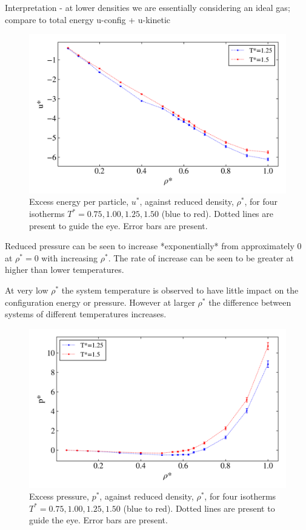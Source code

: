 \documentclass[10pt, twocolumn]{revtex4}    %
\begin{document}
Interpretation - at lower densities we are essentially considering an ideal gas; compare to total energy u-config + u-kinetic

\begin{figure}
	\includegraphics[width=\linewidth]{figures/excessEnergyPressure/excessEnergy.png}
	\caption{Excess energy per particle, $u^*$, against reduced density, $\rho{}^*$, for four isotherms $T^{*} = 0.75, 1.00, 1.25, 1.50$ (blue to red). Dotted lines are present to guide the eye. Error bars are present.}
	\label{fig:excessEnergy}
\end{figure}

Reduced pressure can be seen to increase *exponentially* from approximately $0$ at $\rho{}^*=0$ with increasing $\rho{}^*$. The rate of increase can be seen to be greater at higher than lower temperatures.


At very low $\rho{}^*$ the system temperature is observed to have little impact on the configuration energy or pressure. However at larger $\rho{}^*$ the difference between systems of different temperatures increases.


\begin{figure}
	\includegraphics[width=\linewidth]{figures/excessEnergyPressure/excessPressure.png}
	\caption{Excess pressure, $p^*$, against reduced density, $\rho{}^*$, for four isotherms $T^{*} = 0.75, 1.00, 1.25, 1.50$ (blue to red). Dotted lines are present to guide the eye. Error bars are present.}
	\label{fig:excessPressure}
\end{figure}
\end{document}
